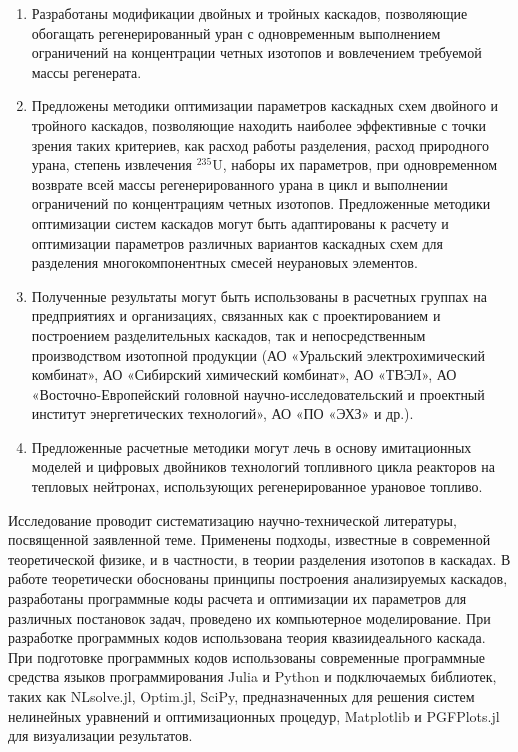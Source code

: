 {\influence} 
\begin{enumerate}
  \item Разработаны модификации двойных и тройных каскадов, позволяющие обогащать регенерированный уран с одновременным выполнением ограничений на концентрации четных изотопов и вовлечением требуемой массы регенерата.
  \item Предложены методики оптимизации параметров каскадных схем двойного и тройного каскадов, позволяющие находить наиболее эффективные с точки зрения таких критериев, как расход работы разделения, расход природного урана, степень извлечения $^{235}$U, наборы их параметров, при одновременном возврате всей массы регенерированного урана в цикл и выполнении ограничений по концентрациям четных изотопов. Предложенные методики оптимизации систем каскадов могут быть адаптированы к расчету и оптимизации параметров различных вариантов каскадных схем для разделения многокомпонентных смесей неурановых элементов.
  \item Полученные результаты могут быть использованы в расчетных группах на предприятиях и организациях, связанных как с проектированием и построением разделительных каскадов, так и непосредственным производством изотопной продукции (АО «Уральский электрохимический комбинат», АО «Сибирский химический комбинат», АО «ТВЭЛ», АО «Восточно-Европейский головной научно-исследовательский и проектный институт энергетических технологий», АО «ПО «ЭХЗ» и др.).
  \item Предложенные расчетные методики могут лечь в основу имитационных моделей и цифровых двойников технологий топливного цикла реакторов на тепловых нейтронах, использующих регенерированное урановое топливо.  
\end{enumerate}

{\methods}
Исследование проводит систематизацию научно-технической литературы, посвященной заявленной теме.
Применены подходы, известные в современной теоретической физике, и в частности, в теории разделения изотопов в каскадах.
В работе теоретически обоснованы принципы построения анализируемых каскадов, разработаны программные коды расчета и оптимизации их параметров для различных постановок задач, проведено их компьютерное моделирование.
При разработке программных кодов использована теория квазиидеального каскада. При подготовке программных кодов использованы современные программные средства языков программирования Julia и Python и подключаемых библиотек, таких как NLsolve.jl, Optim.jl, SciPy, предназначенных для решения систем нелинейных уравнений и оптимизационных процедур, Matplotlib и PGFPlots.jl для визуализации результатов.

